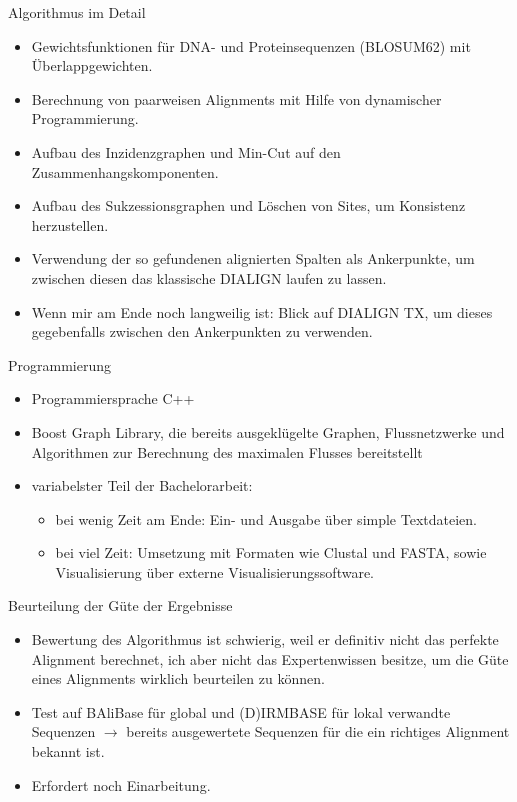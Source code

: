 \documentclass[wide,xcolor={x11names},hyperref={colorlinks=false},pantone312]{beamer}
\begin{document}
\begin{frame}[t]{Algorithmus im Detail}
	\small
	\begin{itemize}
		\item Gewichtsfunktionen für DNA- und Proteinsequenzen (BLOSUM62) mit Überlappgewichten.
		\item Berechnung von paarweisen Alignments mit Hilfe von dynamischer Programmierung.
		\item Aufbau des Inzidenzgraphen und Min-Cut auf den Zusammenhangskomponenten.
		\item Aufbau des Sukzessionsgraphen und Löschen von Sites, um Konsistenz herzustellen.
		\item Verwendung der so gefundenen alignierten Spalten als Ankerpunkte, um zwischen diesen das klassische DIALIGN laufen zu lassen.
		\item Wenn mir am Ende noch langweilig ist: Blick auf DIALIGN TX, um dieses gegebenfalls zwischen den Ankerpunkten zu verwenden.
	\end{itemize}
	\normalsize
\end{frame}

\begin{frame}[t]{Programmierung}
	\begin{itemize}
		\item Programmiersprache C++
		\item Boost Graph Library, die bereits ausgeklügelte Graphen, Flussnetzwerke und Algorithmen zur Berechnung des maximalen Flusses bereitstellt
		\item variabelster Teil der Bachelorarbeit:
		\begin{itemize}
			\item bei wenig Zeit am Ende: Ein- und Ausgabe über simple Textdateien.
			\item bei viel Zeit: Umsetzung mit Formaten wie Clustal und FASTA, sowie Visualisierung über externe Visualisierungssoftware.
		\end{itemize}
	\end{itemize}
\end{frame}

\begin{frame}[t]{Beurteilung der Güte der Ergebnisse}
	\begin{itemize}
		\item Bewertung des Algorithmus ist schwierig, weil er definitiv nicht das perfekte Alignment berechnet, ich aber nicht das Expertenwissen besitze, um die Güte eines Alignments wirklich beurteilen zu können.
		\item Test auf BAliBase für global und (D)IRMBASE für lokal verwandte Sequenzen $\rightarrow$ bereits ausgewertete Sequenzen für die ein richtiges Alignment bekannt ist.
		\item Erfordert noch Einarbeitung.
	\end{itemize}
\end{frame}
\end{document}
